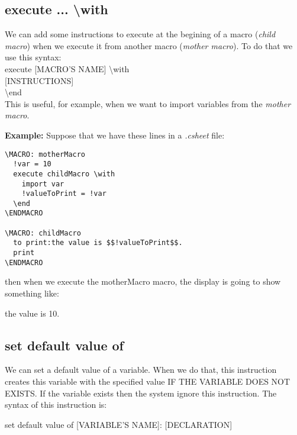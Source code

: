 \documentclass[11pt,a4paper,openright,oneside]{book}
\newenvironment{ex}
{
  \setlength{\parindent}{0cm}
  \large \textbf{Example:} \normalsize 
}
{}
\begin{document}
\subsection{\textsf{execute ... \textbackslash with}}
We can add some instructions to execute at the begining of a macro (\textit{child macro}) when we execute it from another macro (\textit{mother macro}). To do that we use this syntax:
\vspace{5px}\\
\textsf{execute \textsc{\scriptsize[MACRO'S NAME]} \textbackslash with} \\
\textsc{\scriptsize[INSTRUCTIONS]} \\
\textsf{\textbackslash end} \\

This is useful, for example, when we want to import variables from the \textit{mother macro}.

\begin{ex} Suppose that we have these lines in a \textit{.csheet} file:
  \begin{lstlisting}
\MACRO: motherMacro
  !var = 10
  execute childMacro \with
    import var
    !valueToPrint = !var
  \end
\ENDMACRO

\MACRO: childMacro
  to print:the value is $$!valueToPrint$$.
  print
\ENDMACRO
  \end{lstlisting}
then when we execute the \textsf{motherMacro} macro, the display is going to show something like:
\vspace{5px}

\textsf{the value is 10.}
  
\end{ex}

\subsection{\textsf{set default value of}}

We can set a default value of a variable. When we do that, this instruction creates this variable with the specified value IF THE VARIABLE DOES NOT EXISTS. If the variable exists then the system ignore this instruction. The syntax of this instruction is:
\begin{center} \textsf{set default value of \textsc{\scriptsize[VARIABLE'S NAME]}: \textsc{\scriptsize[DECLARATION]}} \end{center}
\end{document}
